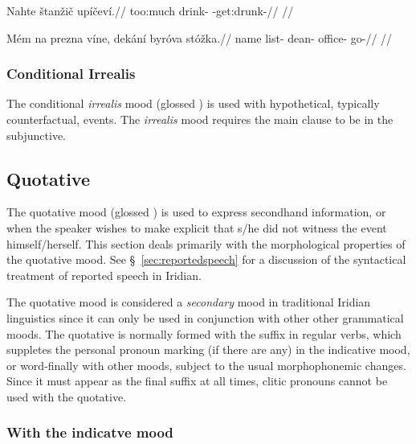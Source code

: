 \pex
\begingl
\gla Nahte \v{s}tan\v{z}i\v{c} up\'i\v{c}ev\'i.//
\glb too:much drink- -get:drunk-//
\glft {}//
\endgl
\xe

\pex
\begingl
\gla M\'em na prezna v\'ine, dek\'an\'i byr\'ova st\'o\v{z}ka.//
\glb name  list-  dean- office- go-//
\glft {}//
\endgl
\xe

\subsubsection{Conditional Irrealis}
The conditional \textit{irrealis} mood (glossed ) is used with hypothetical, typically counterfactual, events. The \emph{irrealis} mood requires the main clause to be in the subjunctive.

\subsection{Quotative}\label{sec:quotative}
\par The quotative mood (glossed ) is used to express secondhand information, or when the speaker wishes to make explicit that s/he did not witness the event himself/herself. This section deals primarily with the morphological properties of the quotative mood. See \S~\ref{sec:reportedspeech} for a discussion of the syntactical treatment of reported speech in Iridian.

The quotative mood is considered a \emph{secondary} mood in traditional Iridian linguistics since it can only be used in conjunction with other other grammatical moods. The quotative is normally formed with the suffix  in regular verbs, which suppletes the personal pronoun marking (if there are any) in the indicative mood, or word-finally with other moods, subject to the usual morphophonemic changes. Since it must appear as the final suffix at all times, clitic pronouns cannot be used with the quotative.


\subsubsection{With the indicatve mood}

